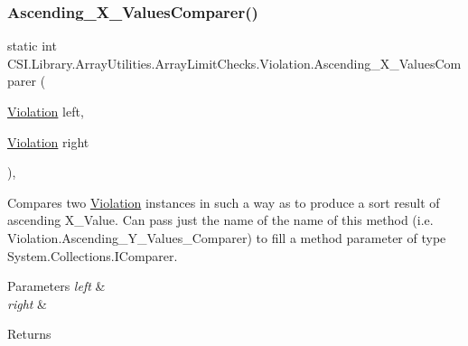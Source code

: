 \subsubsection{\texorpdfstring{Ascending\_X\_ValuesComparer()}{Ascending\_X\_ValuesComparer()}}
{\footnotesize\ttfamily static int C\+S\+I.\+Library.\+Array\+Utilities.\+Array\+Limit\+Checks.\+Violation.\+Ascending\+\_\+\+X\+\_\+\+Values\+Comparer (\begin{DoxyParamCaption}\item[{\mbox{\hyperlink{class_c_s_i_1_1_library_1_1_array_utilities_1_1_array_limit_checks_1_1_violation}{Violation}}}]{left,  }\item[{\mbox{\hyperlink{class_c_s_i_1_1_library_1_1_array_utilities_1_1_array_limit_checks_1_1_violation}{Violation}}}]{right }\end{DoxyParamCaption})\hspace{0.3cm}{\ttfamily [inline]}, {\ttfamily [static]}}



Compares two \mbox{\hyperlink{class_c_s_i_1_1_library_1_1_array_utilities_1_1_array_limit_checks_1_1_violation}{Violation}} instances in such a way as to produce a sort result of ascending X\+\_\+\+Value. Can pass just the name of the name of this method (i.\+e. Violation.\+Ascending\+\_\+\+Y\+\_\+\+Values\+\_\+\+Comparer) to fill a method parameter of type System.\+Collections.\+I\+Comparer. 


\begin{DoxyParams}{Parameters}
{\em left} & \\
\hline
{\em right} & \\
\hline
\end{DoxyParams}
\begin{DoxyReturn}{Returns}

\end{DoxyReturn}
\mbox{\label{class_c_s_i_1_1_library_1_1_array_utilities_1_1_array_limit_checks_1_1_violation_a4e93e075cf895577206d1abfe44aa47f}} 
